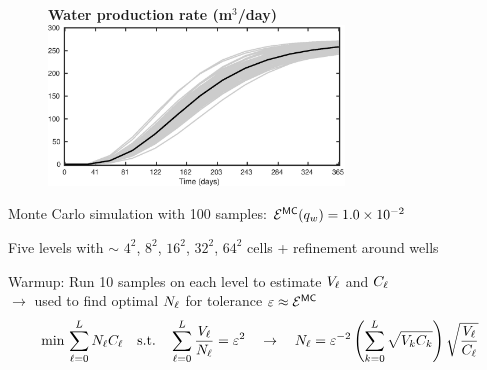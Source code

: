 \begin{frame}{\name{}}
    \begin{figure}
        \centering
        \textbf{Water production rate (m$^3$/day)}
        \includegraphics[width = 0.7\textwidth]{figures/example-1/water-rate.eps}
    \end{figure}
    \begin{squarelist}
        \item Monte Carlo simulation with 100 samples: $\mathcal{E}^{\mathsf{MC}}(q_w) = 1.0\times10^{-2}$
    \end{squarelist}
\end{frame}

\begin{frame}{\name{}}
    \begin{figure}
        \centering
    \end{figure}
    \begin{squarelist}
        \item<1-> Five levels with $\sim$ $4^2$, $8^2$, $16^2$, $32^2$, $64^2$ cells + refinement around wells
        \item<2-> Warmup: Run 10 samples on each level to estimate $V_\ell$ and $C_\ell$ \\
        $\rightarrow$ used to find optimal $N_\ell$ for tolerance $\varepsilon \approx \mathcal{E}^{{\mathsf{MC}}}$
        \begin{equation*}
            \min\, \sum_{\ell = 0}^L N_\ell C_\ell \quad \text{s.t.} \quad \sum_{\ell = 0}^L\frac{V_\ell}{N_\ell} = \varepsilon^2 \quad \rightarrow \quad N_\ell = \varepsilon^{-2}\left(\sum_{k = 0}^L \sqrt{V_k C_k}\right)\sqrt{\frac{V_\ell}{C_\ell}}
        \end{equation*}
    \end{squarelist}
\end{frame}

